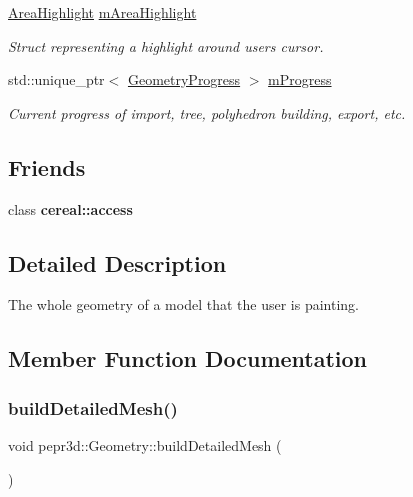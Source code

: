 \begin{DoxyCompactItemize}
\mbox{\hyperlink{structpepr3d_1_1_geometry_1_1_area_highlight}{Area\+Highlight}} \mbox{\hyperlink{classpepr3d_1_1_geometry_a47baed18f665dbbe1c69b9b400ace85c}{m\+Area\+Highlight}}
\begin{DoxyCompactList}\small\item\em Struct representing a highlight around user\textquotesingle{}s cursor. \end{DoxyCompactList}\item 
\mbox{\label{classpepr3d_1_1_geometry_a0bf613cec3cd854058e183f199542ada}} 
std\+::unique\+\_\+ptr$<$ \mbox{\hyperlink{structpepr3d_1_1_geometry_progress}{Geometry\+Progress}} $>$ \mbox{\hyperlink{classpepr3d_1_1_geometry_a0bf613cec3cd854058e183f199542ada}{m\+Progress}}
\begin{DoxyCompactList}\small\item\em Current progress of import, tree, polyhedron building, export, etc. \end{DoxyCompactList}\end{DoxyCompactItemize}
\subsection*{Friends}
\begin{DoxyCompactItemize}
\item 
\mbox{\label{classpepr3d_1_1_geometry_ab2f44cbb59a08132f4c843e5225bba0e}} 
class {\bfseries cereal\+::access}
\end{DoxyCompactItemize}


\subsection{Detailed Description}
The whole geometry of a model that the user is painting. 

\subsection{Member Function Documentation}
\mbox{\label{classpepr3d_1_1_geometry_a5f0594ebe7f3a779dc9cf18f943f1c56}} 
\subsubsection{\texorpdfstring{buildDetailedMesh()}{buildDetailedMesh()}}
{\footnotesize\ttfamily void pepr3d\+::\+Geometry\+::build\+Detailed\+Mesh (\begin{DoxyParamCaption}{ }\end{DoxyParamCaption})\hspace{0.3cm}{\ttfamily [private]}}



